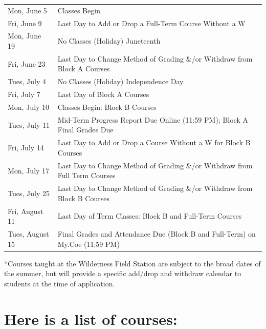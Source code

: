 \documentclass[
  letterpaper,
]{scrbook}
\renewcommand\toprule[2]\relax
\renewcommand\bottomrule[2]\relax
\begin{document}
\begin{longtable}[]{@{}
  >{\raggedright\arraybackslash}p{}
  >{\raggedleft\arraybackslash}p{}@{}}
\toprule\noalign{}
\endhead
\bottomrule\noalign{}
\endlastfoot
Mon, June 5 & Classes Begin \\
Fri, June 9 & Last Day to Add or Drop a Full-Term Course Without a W \\
Mon, June 19 & No Classes (Holiday) Juneteenth \\
Fri, June 23 & Last Day to Change Method of Grading \&/or Withdraw from
Block A Courses \\
Tues, July 4 & No Classes (Holiday) Independence Day \\
Fri, July 7 & Last Day of Block A Courses \\
Mon, July 10 & Classes Begin: Block B Courses \\
Tues, July 11 & Mid-Term Progress Report Due Online (11:59 PM); Block A
Final Grades Due \\
Fri, July 14 & Last Day to Add or Drop a Course Without a W for Block B
Courses \\
Mon, July 17 & Last Day to Change Method of Grading \&/or Withdraw from
Full Term Courses \\
Tues, July 25 & Last Day to Change Method of Grading \&/or Withdraw from
Block B Courses \\
Fri, August 11 & Last Day of Term Classes: Block B and Full-Term
Courses \\
Tues, August 15 & Final Grades and Attendance Due (Block B and
Full-Term) on My.Coe (11:59 PM) \\
\end{longtable}

*Courses taught at the Wilderness Field Station are subject to the broad
dates of the summer, but will provide a specific add/drop and withdraw
calendar to students at the time of application.

\hypertarget{here-is-a-list-of-courses}{%
\chapter*{Here is a list of courses:}\label{here-is-a-list-of-courses}}

\end{document}
